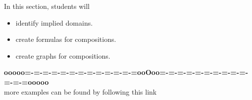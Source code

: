 \documentclass{ximera}
\begin{document}
\begin{sectionOutcomes}
In this section, students will 

\begin{itemize}
\item identify implied domains.
\item create formulas for compositions.
\item create graphs for compositions.
\end{itemize}
\end{sectionOutcomes}















\begin{center}
\textbf{\textcolor{green!50!black}{ooooo=-=-=-=-=-=-=-=-=-=-=-=-=ooOoo=-=-=-=-=-=-=-=-=-=-=-=-=ooooo}} \\

more examples can be found by following this link\\ 

\end{center}
\end{document}
